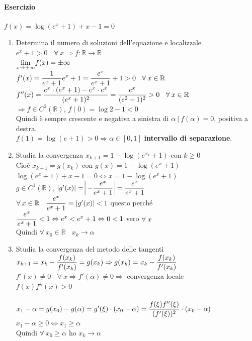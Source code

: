 \documentclass[10pt]{book}
\begin{document}
\paragraph{Esercizio} $f(x) = \log(e^x + 1) + x - 1 = 0$
\begin{enumerate}
	\item Determina il numero di soluzioni dell'equazione e localizzale\\
	$e^x + 1 > 0\:\:\:\:\forall\:x\Rightarrow f:\mathbb{R}\rightarrow\mathbb{R}$\\
	$\mathlarger{\lim_{x\to\pm\infty}}f(x) = \pm\infty$\\
	$f'(x) = \mathlarger{\frac{1}{e^x + 1}e^x + 1} = \mathlarger{\frac{e^x}{e^x + 1}}+1 > 0\:\:\:\:\forall\:x\in\mathbb{R}$\\
	$f''(x) = \mathlarger{\frac{e^x\cdot(e^x + 1) - e^x\cdot e^x}{(e^x + 1)^2}} = \mathlarger{\frac{e^x}{(e^2 + 1)^2}} > 0\:\:\:\:\forall\:x\in\mathbb{R}$\\
	$\Rightarrow f \in C^2(\mathbb{R})$, $f(0) = \log 2 - 1 < 0$\\
	Quindi è sempre crescente e negativa a sinistra di $\alpha\:|\:f(\alpha) = 0$, positiva a destra.\\
	$f(1) = \log(e + 1) > 0 \Rightarrow \alpha\in[0, 1]$ \textbf{intervallo di separazione}.
	\item Studia la convergenza $x_{k+1} = 1 - \log(e^{x_k} + 1)$ con $k \geq 0$\\
	Cioè $x_{k+1} = g(x_k)$ con $g(x) = 1 - \log(e^x + 1)$\\
	$\log(e^x + 1) + x - 1 = 0 \Leftrightarrow x = 1 - \log(e^x + 1)$\\
	$g \in C^1(\mathbb{R})$, $|g'(x)| =\:\vline\mathlarger{-\frac{e^x}{e^x + 1}}\:\vline = \mathlarger{\frac{e^x}{e^x + 1}}$\\
	$\forall\:x\in\mathbb{R}\:\:\:\:\mathlarger{\frac{e^x}{e^x + 1}} = |g'(x)| < 1$ questo perché $\mathlarger{\frac{e^x}{e^x + 1}} < 1 \Leftrightarrow e^x < e^x + 1 \Leftrightarrow 0 < 1$ vero $\forall\:x$\\
	Quindi $\forall\:x_0\in\mathbb{R}\:\:\:\:x_k \longrightarrow \alpha$
	\item Studia la convergenza del metodo delle tangenti\\
	$x_{k+1} = x_k - \mathlarger{\frac{f(x_k)}{f'(x_k)}} = g(x_k) \Rightarrow g(x_k) = x_k - \mathlarger{\frac{f(x_k)}{f'(x_k)}}$\\
	$f'(x) \neq 0\:\:\:\:\forall\:x \Rightarrow f'(\alpha) \neq 0 \Rightarrow$ convergenza locale\\
	$f(x)f''(x) > 0$\\\\
	$x_1 - \alpha = g(x_0) - g(\alpha) = g'(\xi)\cdot(x_0 - \alpha) = \mathlarger{\frac{f(\xi)f''(\xi)}{(f'(\xi))^2}}\cdot(x_0 - \alpha)$\\
	$x_1 - \alpha \geq 0 \Leftrightarrow x_1 \geq \alpha$\\
	Quindi $\forall\:x_0\geq\alpha$ ho $x_k \longrightarrow \alpha$
\end{enumerate}
\end{document}
